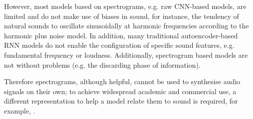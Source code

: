 However, most models based on spectrograms, e.g. raw CNN-based models, are limited and do not make use of biases in sound, for instance, the tendency of natural sounds to oscillate sinusoidally at harmonic frequencies according to the harmonic plus noise model. In addition, many traditional autoencoder-based RNN models do not enable the configuration of specific sound features, e.g. fundamental frequency or loudness. Additionally, spectrogram based models are not without problems (e.g. the discarding phase of information).

Therefore spectrograms, although helpful, cannot be used to synthesise audio signals on their own; to achieve widespread academic and commercial use, a different representation to help a model relate them to sound is required, for example, .